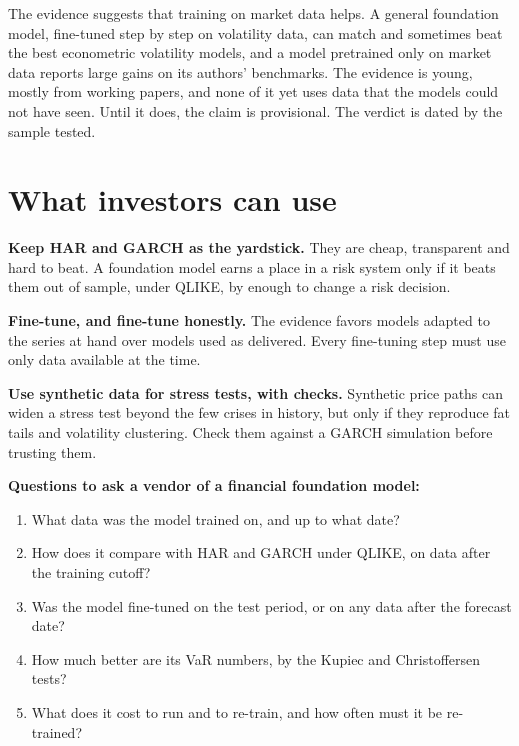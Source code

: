 The evidence suggests that training on market data helps. A general foundation model, fine-tuned step by step on volatility data, can match and sometimes beat the best econometric volatility models, and a model pretrained only on market data reports large gains on its authors' benchmarks. The evidence is young, mostly from working papers, and none of it yet uses data that the models could not have seen. Until it does, the claim is provisional. The verdict is dated by the sample tested.

\section{What investors can use}
\label{sec:22-investors}

\textbf{Keep HAR and GARCH as the yardstick.} They are cheap, transparent and hard to beat. A foundation model earns a place in a risk system only if it beats them out of sample, under QLIKE, by enough to change a risk decision.

\textbf{Fine-tune, and fine-tune honestly.} The evidence favors models adapted to the series at hand over models used as delivered. Every fine-tuning step must use only data available at the time.

\textbf{Use synthetic data for stress tests, with checks.} Synthetic price paths can widen a stress test beyond the few crises in history, but only if they reproduce fat tails and volatility clustering. Check them against a GARCH simulation before trusting them.

\textbf{Questions to ask a vendor of a financial foundation model:}

\begin{enumerate}
  \item What data was the model trained on, and up to what date?
  \item How does it compare with HAR and GARCH under QLIKE, on data after the training cutoff?
  \item Was the model fine-tuned on the test period, or on any data after the forecast date?
  \item How much better are its VaR numbers, by the Kupiec and Christoffersen tests?
  \item What does it cost to run and to re-train, and how often must it be re-trained?
\end{enumerate}

